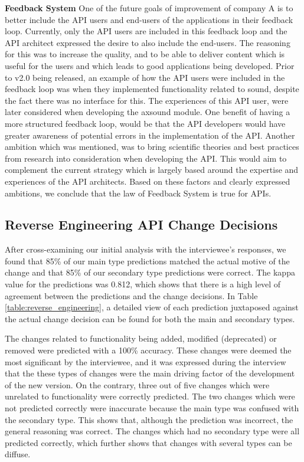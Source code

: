 \documentclass{sig-alternate}
\begin{document}
\smallskip \noindent
\textbf{Feedback System  } 
One of the future goals of improvement of company A is to better include the API users and end-users of the applications in their feedback loop. Currently, only the API users are included in this feedback loop and the API architect expressed the desire to also include the end-users. The reasoning for this was to increase the quality, and to be able to deliver content which is useful for the users and which leads to good applications being developed. Prior to v2.0 being released, an example of how the API users were included in the feedback loop was when they implemented functionality related to sound, despite the fact there was no interface for this.  The experiences of this API user, were later considered when developing the axsound module. One benefit of having a more structured feedback loop, would be that the API developers would have greater awareness of potential errors in the implementation of the API. Another ambition which was mentioned, was to bring scientific theories and best practices from research into consideration when developing the API. This would aim to complement the current strategy which is largely based around the expertise and experiences of the API architects. Based on these factors and clearly expressed ambitions, we conclude that the law of Feedback System is true for APIs. 



\subsection{Reverse Engineering API Change Decisions}
After cross-examining our initial analysis with the interviewee's responses, we found that 85\% of our main type predictions matched the actual motive of the change and that 85\% of our secondary type predictions were correct. The kappa value \cite{cohen1968weighted} for the predictions was 0.812, which shows that there is a high level of agreement between the predictions and the change decisions. In Table \ref{table:reverse_engineering}, a detailed view of each prediction juxtaposed against the actual change decision can be found for both the main and secondary types.  

The changes related to functionality being added, modified (deprecated) or removed were predicted with a 100\% accuracy. These changes were deemed the most significant by the interviewee, and it was expressed during the interview that the these types of changes were the main driving factor of the development of the new version. On the contrary, three out of five changes which were unrelated to functionality were correctly predicted. The two changes which were not predicted correctly were inaccurate because the main type was confused with the secondary type. This shows that, although the prediction was incorrect, the general reasoning was correct. The changes which had no secondary type were all predicted correctly, which further shows that changes with several types can be diffuse. 
\end{document}
